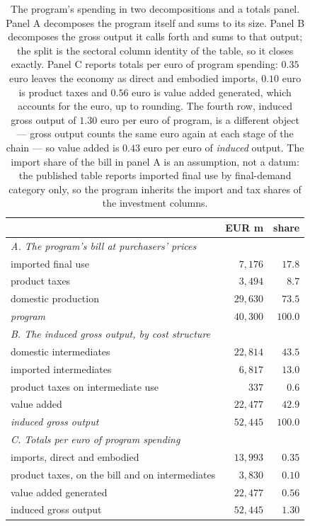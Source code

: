 \begin{table}[t]
\centering
\small
\begin{tabular}{lrr}
\toprule
 & EUR m & share \\
\midrule
\multicolumn{3}{l}{\emph{A. The program's bill at purchasers' prices}}\\
imported final use & $7{,}176$ & $17.8$ \\
product taxes & $3{,}494$ & $8.7$ \\
domestic production & $29{,}630$ & $73.5$ \\
\emph{program} & $40{,}300$ & $100.0$ \\
\midrule
\multicolumn{3}{l}{\emph{B. The induced gross output, by cost structure}}\\
domestic intermediates & $22{,}814$ & $43.5$ \\
imported intermediates & $6{,}817$ & $13.0$ \\
product taxes on intermediate use & $337$ & $0.6$ \\
value added & $22{,}477$ & $42.9$ \\
\emph{induced gross output} & $52{,}445$ & $100.0$ \\
\midrule
\multicolumn{3}{l}{\emph{C. Totals per euro of program spending}}\\
imports{,} direct and embodied & $13{,}993$ & $0.35$ \\
product taxes{,} on the bill and on intermediates & $3{,}830$ & $0.10$ \\
value added generated & $22{,}477$ & $0.56$ \\
induced gross output & $52{,}445$ & $1.30$ \\
\bottomrule
\end{tabular}
\caption{The program's spending in two decompositions and a totals panel. Panel A decomposes the
program itself and sums to its size. Panel B decomposes the gross output it
calls forth and sums to that output; the split is the sectoral column identity
of the table, so it closes exactly. Panel C reports totals per euro of program
spending: $0.35$ euro leaves the economy as direct and embodied
imports, $0.10$ euro is product taxes and $0.56$ euro is
value added generated, which accounts for the euro, up to rounding. The fourth row,
induced gross output of $1.30$ euro per euro of program, is a different object ---
gross output counts the same euro again at each stage of the chain --- so value added is
$0.43$ euro per euro of \emph{induced} output. The
import share of the bill in panel A is an assumption, not a datum: the published
table reports imported final use by final-demand category only, so the program
inherits the import and tax shares of the investment columns.}
\label{tab:pipeline-composition}
\end{table}
